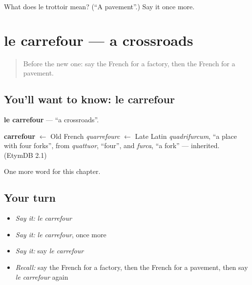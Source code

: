 \begin{tcolorbox}[breakable,colback=teal!4,colframe=teal!35!black,title={Before you move on}]
What does le trottoir mean? (\textquotedblleft{}A pavement\textquotedblright{}.) Say it once more.
\end{tcolorbox}
\section[le carrefour]{le carrefour — a crossroads}

\label{lesson:FR-C108-carrefour}



\begin{quote}
Before the new one: say the French for a factory, then the French for a pavement.
\end{quote}

\subsection*{You'll want to know: le carrefour}
\textbf{le carrefour} — \textquotedblleft{}a crossroads\textquotedblright{}.

\begin{cousinweb}
\textbf{carrefour} $\leftarrow$ Old French \emph{quarrefourc} $\leftarrow$ Late Latin \emph{quadrifurcum}, \textquotedblleft{}a place with four forks\textquotedblright{}, from \emph{quattuor}, \textquotedblleft{}four\textquotedblright{}, and \emph{furca}, \textquotedblleft{}a fork\textquotedblright{} — inherited. (EtymDB 2.1)
\end{cousinweb}

\begin{grammarlens}[title={What you've built}]
One more word for this chapter.
\end{grammarlens}

\subsection*{Your turn}
\begin{itemize}
\raggedright
  \item \emph{Say it:} \emph{le carrefour}
  \item \emph{Say it:} \emph{le carrefour}, once more
  \item \emph{Say it:} say \emph{le carrefour}
  \item \emph{Recall:} say the French for a factory, then the French for a pavement, then say \emph{le carrefour} again
\end{itemize}

